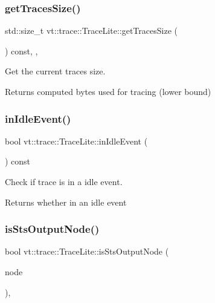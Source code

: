\subsubsection{\texorpdfstring{get\+Traces\+Size()}{getTracesSize()}}
{\footnotesize\ttfamily std\+::size\+\_\+t vt\+::trace\+::\+Trace\+Lite\+::get\+Traces\+Size (\begin{DoxyParamCaption}{ }\end{DoxyParamCaption}) const\hspace{0.3cm}{\ttfamily [inline]}, {\ttfamily [protected]}, {\ttfamily [noexcept]}}



Get the current traces size. 

\begin{DoxyReturn}{Returns}
computed bytes used for tracing (lower bound) 
\end{DoxyReturn}
\mbox{\label{structvt_1_1trace_1_1_trace_lite_ad3b81920d008e46dff0eb205ca99bd22}} 
\subsubsection{\texorpdfstring{in\+Idle\+Event()}{inIdleEvent()}}
{\footnotesize\ttfamily bool vt\+::trace\+::\+Trace\+Lite\+::in\+Idle\+Event (\begin{DoxyParamCaption}{ }\end{DoxyParamCaption}) const}



Check if trace is in a idle event. 

\begin{DoxyReturn}{Returns}
whether in an idle event 
\end{DoxyReturn}
\mbox{\label{structvt_1_1trace_1_1_trace_lite_acfad34ebd68c53547dcff4115dd54388}} 
\subsubsection{\texorpdfstring{is\+Sts\+Output\+Node()}{isStsOutputNode()}}
{\footnotesize\ttfamily bool vt\+::trace\+::\+Trace\+Lite\+::is\+Sts\+Output\+Node (\begin{DoxyParamCaption}\item[{\hyperlink{namespacevt_a866da9d0efc19c0a1ce79e9e492f47e2}{Node\+Type}}]{node }\end{DoxyParamCaption})\hspace{0.3cm}{\ttfamily [static]}, {\ttfamily [protected]}}



